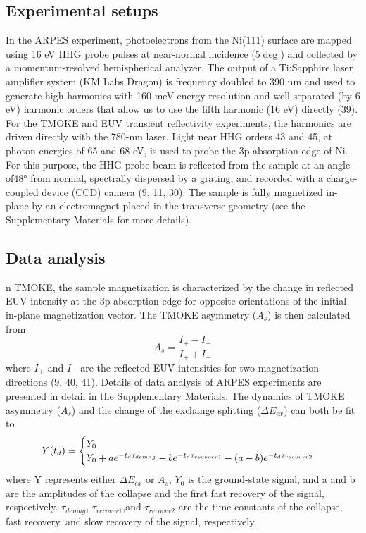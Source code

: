 \subsection{Experimental setups}
In the ARPES experiment, photoelectrons from the Ni(111) surface are mapped using 16 eV HHG probe pulses at near-normal incidence (5$\deg$) and collected by a momentum-resolved hemispherical analyzer. The output of a Ti:Sapphire laser amplifier system (KM Labs Dragon) is frequency doubled to 390 nm and used to generate high harmonics with 160 meV energy resolution and well-separated (by 6 eV) harmonic orders that allow us to use the fifth harmonic (16 eV) directly (39). For the TMOKE and EUV transient reflectivity experiments, the harmonics are driven directly with the 780-nm laser. Light near HHG orders 43 and 45, at photon energies of 65 and 68 eV, is used to probe the 3p absorption edge of Ni. For this purpose, the HHG probe beam is reflected from the sample at an angle of48° from normal, spectrally dispersed by a grating, and recorded with a charge-coupled device (CCD) camera (9, 11, 30). The sample is fully magnetized in-plane by an electromagnet placed in the transverse geometry (see the Supplementary Materials for more details).

\subsection{Data analysis}
n TMOKE, the sample magnetization is characterized by the change in reflected EUV intensity at the 3p absorption edge for opposite orientations of the initial in-plane magnetization vector. The TMOKE asymmetry ($A_s$) is then calculated from
\begin{equation}
A_{s}=\frac{I_{+}-I_{-}}{I_{+}+I_{-}}
\label{eqn:2}
\end{equation}
where $I_+$ and $I_−$ are the reflected EUV intensities for two magnetization directions (9, 40, 41). Details of data analysis of ARPES experiments are presented in detail in the Supplementary Materials. The dynamics of TMOKE asymmetry ($A_s$) and the change of the exchange splitting ($\Delta E_{ex}$) can both be fit to
\begin{equation*}
Y(t_{d}) = 
\begin{cases}
Y_0 \\
Y_0 + a e^{-t_d\/\tau_{demag}}-b e^{-t_d\/\tau_{recover1}}-(a-b)e^{-t_d\/\tau_{recover2}}
\end{cases}
\label{eqn:3}
\end{equation*} 
where Y represents either $\Delta E_{ex}$ or $A_s$, $Y_0$ is the ground-state signal, and a and b are the amplitudes of the collapse and the first fast recovery of the signal, respectively. $\tau_{demag}$, $\tau_{recover1}$,and $\tau_{recover2}$ are the time constants of the collapse, fast recovery, and slow recovery of the signal, respectively.

